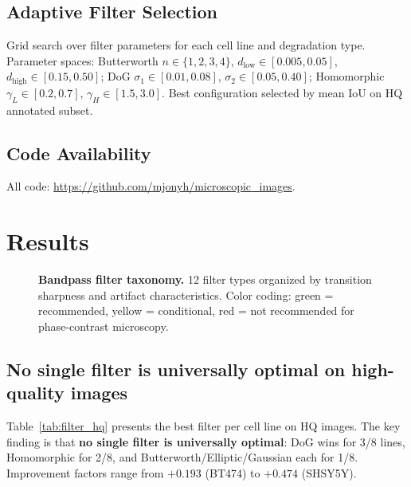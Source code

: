 \documentclass[11pt,a4paper]{article}
\begin{document}
\subsection{Adaptive Filter Selection}
Grid search over filter parameters for each cell line and degradation type. Parameter spaces: Butterworth $n \in \{1,2,3,4\}$, $d_{\text{low}} \in [0.005, 0.05]$, $d_{\text{high}} \in [0.15, 0.50]$; DoG $\sigma_1 \in [0.01, 0.08]$, $\sigma_2 \in [0.05, 0.40]$; Homomorphic $\gamma_L \in [0.2, 0.7]$, $\gamma_H \in [1.5, 3.0]$. Best configuration selected by mean IoU on HQ annotated subset.

\subsection{Code Availability}
All code: \url{https://github.com/mjonyh/microscopic_images}.

\section{Results}
\label{sec:results}

\begin{figure}[H]
\centering

\caption{\textbf{Bandpass filter taxonomy.} 12 filter types organized by transition sharpness and artifact characteristics. Color coding: green = recommended, yellow = conditional, red = not recommended for phase-contrast microscopy.}
\label{fig:taxonomy}
\end{figure}

\subsection{No single filter is universally optimal on high-quality images}

Table~\ref{tab:filter_hq} presents the best filter per cell line on HQ images. The key finding is that \textbf{no single filter is universally optimal}: DoG wins for 3/8 lines, Homomorphic for 2/8, and Butterworth/Elliptic/Gaussian each for 1/8. Improvement factors range from $+0.193$ (BT474) to $+0.474$ (SHSY5Y).
\end{document}
